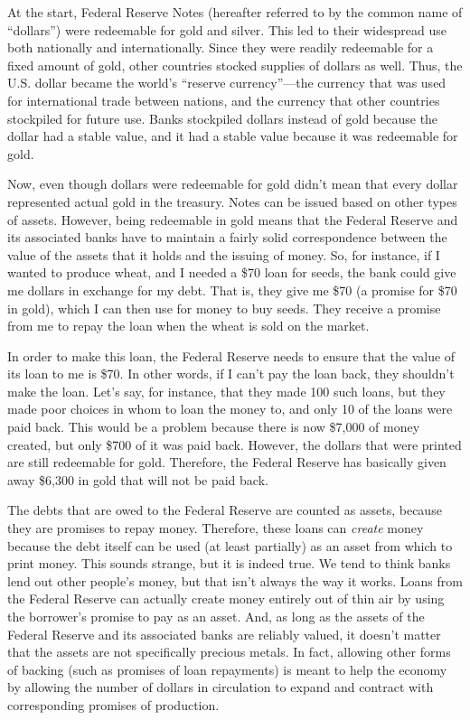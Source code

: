 At the start, Federal Reserve Notes (hereafter referred to by the common
name of “dollars”) were redeemable for gold and silver. This led to
their widespread use both nationally and internationally. Since they
were readily redeemable for a fixed amount of gold, other countries
stocked supplies of dollars as well. Thus, the U.S. dollar became the
world’s “reserve currency”—the currency that was used for international
trade between nations, and the currency that other countries stockpiled
for future use. Banks stockpiled dollars instead of gold because the dollar had a stable value, and it
had a stable value because it was redeemable for gold.

Now, even though dollars were redeemable for gold didn’t mean that every
dollar represented actual gold in the treasury. Notes can be issued
based on other types of assets. However, being redeemable in gold means
that the Federal Reserve and its associated banks have to maintain a fairly solid correspondence
between the value of the assets that it holds and the issuing of money.
So, for instance, if I wanted to produce wheat, and I needed a \$70
loan for seeds, the bank could give me dollars in exchange for my
debt. That is, they give me \$70 (a promise for \$70 in gold), which I
can then use for money to buy seeds. They receive a promise from me to repay the
loan when the wheat is sold on the market. 

In order to make this loan, the Federal Reserve needs to ensure that the
value of its loan to me is \$70. In other words, if I can't pay the loan
back, they shouldn't make the loan.  Let’s say, for instance, that they made
100 such loans, but they made poor choices in whom to loan the money to, 
and only 10 of the loans were paid back. This would be a
problem because there is now \$7,000 of money created, but only \$700
of it was paid back. However, the dollars that were printed are still
redeemable for gold. Therefore, the Federal Reserve has basically given
away \$6,300 in gold that will not be paid back. 

The debts that are owed to the Federal Reserve are counted as assets, 
because they are promises to repay money.  Therefore, these loans can \textit{create}
money because the debt itself can be used (at least partially) as an asset from which to print money.
This sounds strange, but it is indeed true.  We tend to think banks lend out
other people's money, but that isn't always the way it works.  Loans 
from the Federal Reserve can actually create money entirely out of 
thin air by using the
borrower's promise to pay as an asset.  And, as long as the assets
of the Federal Reserve and its associated banks are reliably valued, it doesn’t matter
that the assets are not specifically precious metals. In fact, allowing other
forms of backing (such as promises of loan repayments) is meant to help the economy
by allowing the
number of dollars in circulation to expand and contract with
corresponding promises of production. 

